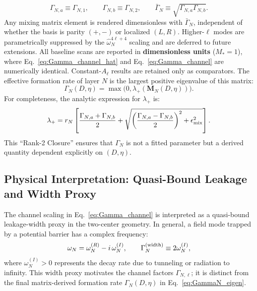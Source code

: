 \documentclass[aps,prd,onecolumn,notitlepage,nofootinbib,superscriptaddress,11pt,floatfix]{revtex4-2}
\begin{document}
\begin{equation}
\Gamma_{N,a}\equiv \Gamma_{N,1},\qquad
\Gamma_{N,b}\equiv \Gamma_{N,2},\qquad
\bar{\Gamma}_N\equiv\sqrt{\Gamma_{N,a}\Gamma_{N,b}}.
\label{eq:gamma_basis_map}
\end{equation}
Any mixing matrix element is rendered dimensionless with $\bar{\Gamma}_N$, independent of whether the basis is parity $(+,-)$ or localized $(L,R)$. Higher-$\ell$ modes are parametrically suppressed by the $\hat{\omega}_N^{4\ell+4}$ scaling and are deferred to future extensions. All baseline scans are reported in \textbf{dimensionless units} ($M_*=1$), where Eq.~\eqref{eq:Gamma_channel_hat} and Eq.~\eqref{eq:Gamma_channel} are numerically identical. Constant-$A_\ell$ results are retained only as comparators.
The effective formation rate of layer $N$ is the largest positive eigenvalue of this matrix:
\begin{equation}
\boxed{
\Gamma_N(D, \eta) = \max\big(0, \lambda_+(\mathbf{M}_N(D,\eta))\big).
}
\label{eq:GammaN_eigen}
\end{equation}
For completeness, the analytic expression for $\lambda_+$ is:
\begin{equation}
\lambda_+ = r_N \left[ \frac{\Gamma_{N,a} + \Gamma_{N,b}}{2} + \sqrt{\left(\frac{\Gamma_{N,a} - \Gamma_{N,b}}{2}\right)^2 + \epsilon_{\rm mix}^2} \right].
\label{eq:lambda_plus}
\end{equation}
This ``Rank-2 Closure'' ensures that $\Gamma_N$ is not a fitted parameter but a derived quantity dependent explicitly on $(D, \eta)$.

\subsection{Physical Interpretation: Quasi-Bound Leakage and Width Proxy}
\label{sec:quasi_bound}

The channel scaling in Eq.~\eqref{eq:Gamma_channel} is interpreted as a quasi-bound leakage-width proxy in the two-center geometry. In general, a field mode trapped by a potential barrier has a complex frequency:
\begin{equation}
\omega_N = \omega_N^{(R)} - i\,\omega_N^{(I)}, \qquad \Gamma_N^{\rm(width)} \equiv 2\omega_N^{(I)},
\label{eq:complex_omega}
\end{equation}
where $\omega_N^{(I)} > 0$ represents the decay rate due to tunneling or radiation to infinity. This width proxy motivates the channel factors $\Gamma_{N,\ell}$; it is distinct from the final matrix-derived formation rate $\Gamma_N(D,\eta)$ in Eq.~\eqref{eq:GammaN_eigen}.
\end{document}
